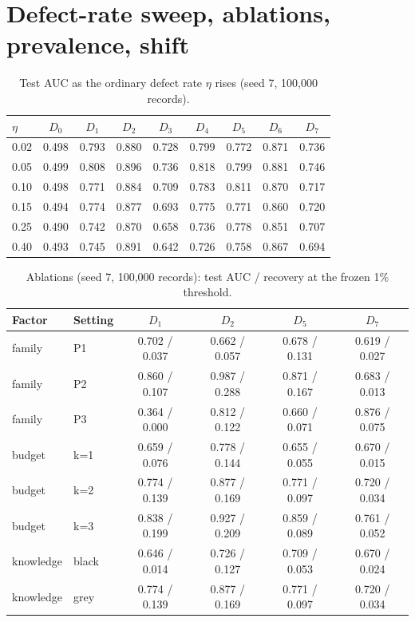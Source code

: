 \documentclass[conference]{IEEEtran}
\begin{document}
\section{Defect-rate sweep, ablations, prevalence, shift}
\begin{table}[t]\caption{Test AUC as the ordinary defect rate $\eta$ rises (seed 7, 100,000 records).}\centering\scriptsize
\begin{tabular}{@{}lcccccccc@{}}\toprule
$\eta$ & $D_0$ & $D_1$ & $D_2$ & $D_3$ & $D_4$ & $D_5$ & $D_6$ & $D_7$ \\\midrule
0.02 & 0.498 & 0.793 & 0.880 & 0.728 & 0.799 & 0.772 & 0.871 & 0.736 \\
0.05 & 0.499 & 0.808 & 0.896 & 0.736 & 0.818 & 0.799 & 0.881 & 0.746 \\
0.10 & 0.498 & 0.771 & 0.884 & 0.709 & 0.783 & 0.811 & 0.870 & 0.717 \\
0.15 & 0.494 & 0.774 & 0.877 & 0.693 & 0.775 & 0.771 & 0.860 & 0.720 \\
0.25 & 0.490 & 0.742 & 0.870 & 0.658 & 0.736 & 0.778 & 0.851 & 0.707 \\
0.40 & 0.493 & 0.745 & 0.891 & 0.642 & 0.726 & 0.758 & 0.867 & 0.694 \\
\bottomrule\end{tabular}\end{table}
\begin{table}[t]\caption{Ablations (seed 7, 100,000 records): test AUC / recovery at the frozen 1\% threshold.}\centering\scriptsize\setlength{\tabcolsep}{3pt}
\begin{tabular}{@{}llcccc@{}}\toprule
Factor & Setting & $D_1$ & $D_2$ & $D_5$ & $D_7$ \\\midrule
family & P1 & 0.702 / 0.037 & 0.662 / 0.057 & 0.678 / 0.131 & 0.619 / 0.027 \\
family & P2 & 0.860 / 0.107 & 0.987 / 0.288 & 0.871 / 0.167 & 0.683 / 0.013 \\
family & P3 & 0.364 / 0.000 & 0.812 / 0.122 & 0.660 / 0.071 & 0.876 / 0.075 \\
budget & k=1 & 0.659 / 0.076 & 0.778 / 0.144 & 0.655 / 0.055 & 0.670 / 0.015 \\
budget & k=2 & 0.774 / 0.139 & 0.877 / 0.169 & 0.771 / 0.097 & 0.720 / 0.034 \\
budget & k=3 & 0.838 / 0.199 & 0.927 / 0.209 & 0.859 / 0.089 & 0.761 / 0.052 \\
knowledge & black & 0.646 / 0.014 & 0.726 / 0.127 & 0.709 / 0.053 & 0.670 / 0.024 \\
knowledge & grey & 0.774 / 0.139 & 0.877 / 0.169 & 0.771 / 0.097 & 0.720 / 0.034 \\
\bottomrule\end{tabular}\end{table}
\end{document}
